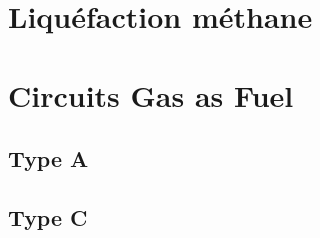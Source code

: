 \documentclass[xcolor=dvipsnames,hyperref={breaklinks=true},mathserif,
professionalfont,12pt]{beamer}
\begin{document}
\section{Liquéfaction méthane}

\begin{frame}
\end{frame}

\section{Circuits Gas as Fuel}

\subsection{Type A}
\begin{frame}
 
\end{frame}


\subsection{Type C}

\begin{frame}
 
\end{frame}
\end{document}
